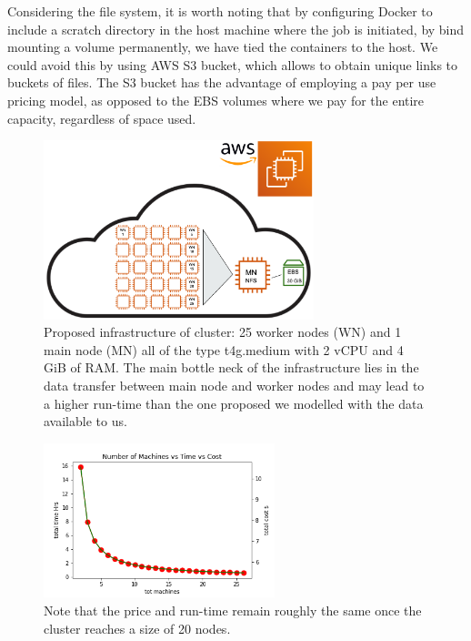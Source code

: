 \documentclass{article}
\begin{document}
Considering the file system, it is worth noting that by configuring Docker to include a scratch directory in the host machine where the job is initiated, by bind mounting a volume permanently, we have tied the containers to the host. 
We could avoid this by using AWS S3 bucket, which allows to obtain unique links to buckets of files.
The S3 bucket has the advantage of employing a pay per use pricing model, as opposed to the EBS volumes where we pay for the entire capacity, regardless of space used.



\printbibliography

\begin{figure}[!h]
\center
    \includegraphics[width=0.7\textwidth]{img/usecase_iaas.png}
\caption{Proposed infrastructure of cluster: 25 worker nodes (WN) and 1 main node (MN) all of the type t4g.medium with 2 vCPU and 4 GiB of RAM. The main bottle neck of the infrastructure lies in the data transfer between main node and worker nodes and may lead to a higher run-time than the one proposed we modelled with the data available to us.}
\label{fig:infrastr}
\end{figure}

\begin{figure}[!h]
\center
    \includegraphics[width=0.6\textwidth]{img/n_machines_time_cost.png}
\caption{Note that the price and run-time remain roughly the same once the cluster reaches a size of 20 nodes.}
\label{fig:n_machines_vs_cost}
\end{figure}
\end{document}
